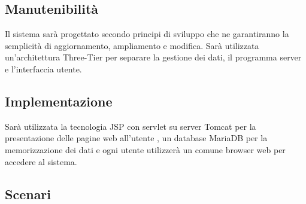 \documentclass[12pt,a4paper]{article}
\begin{document}
\subsection{Manutenibilità}
Il sistema sarà progettato secondo principi di sviluppo che ne garantiranno la semplicità di aggiornamento, ampliamento e modifica.
Sarà utilizzata un'architettura Three-Tier per separare la gestione dei dati, il programma server e l'interfaccia utente.

\subsection{Implementazione}
Sarà utilizzata la tecnologia JSP con servlet su server Tomcat per la presentazione delle pagine web all'utente , un database MariaDB per la memorizzazione dei dati e ogni utente utilizzerà un comune browser web per accedere al sistema.

\newpage
\subsection{Scenari}
\end{document}
